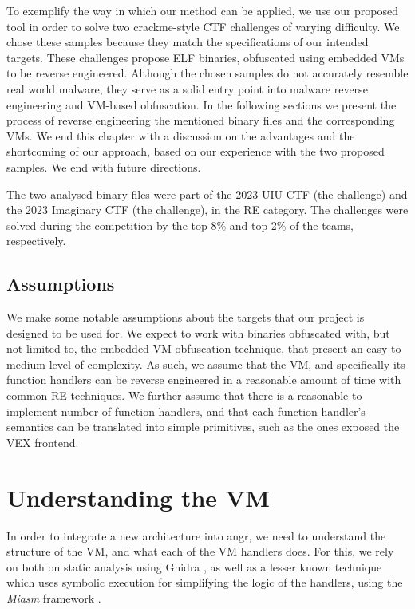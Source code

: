 To exemplify the way in which our method can be applied, we use our proposed tool in order to solve two crackme-style \gls{CTF} challenges of varying difficulty. We chose these samples because they match the specifications of our intended targets. These challenges propose \gls{ELF} binaries, obfuscated using embedded \glspl{VM} to be reverse engineered. Although the chosen samples do not accurately resemble real world malware, they serve as a solid entry point into malware reverse engineering and \gls{VM}-based obfuscation. In the following sections we present the process of reverse engineering the mentioned binary files and the corresponding \glspl{VM}. We end this chapter with a discussion on the advantages and the shortcoming of our approach, based on our experience with the two proposed samples. We end with future directions.

The two analysed binary files were part of the 2023 UIU CTF (the  challenge) \cite{uiu2023} and the 2023 Imaginary CTF \cite{ictf2023} (the  challenge), in the \gls{RE} category. The challenges were solved during the competition by the top 8\% and top 2\% of the teams, respectively.

\subsection{Assumptions}

We make some notable assumptions about the targets that our project is designed to be used for. We expect to work with binaries obfuscated with, but not limited to, the embedded \gls{VM} obfuscation technique, that present an easy to medium level of complexity. As such, we assume that the \gls{VM}, and specifically its function handlers can be reverse engineered in a reasonable amount of time with common \gls{RE} techniques. We further assume that there is a reasonable to implement number of function handlers, and that each function handler's semantics can be translated into simple primitives, such as the ones exposed the  VEX frontend.

\section{Understanding the VM}

In order to integrate a new architecture into angr, we need to understand the structure of the \gls{VM}, and what each of the \gls{VM} handlers does. For this, we rely on both on static analysis using Ghidra \cite{ghidra}, as well as a lesser known technique which uses symbolic execution for simplifying the logic of the handlers, using the \emph{Miasm} framework \cite{miasm}.

